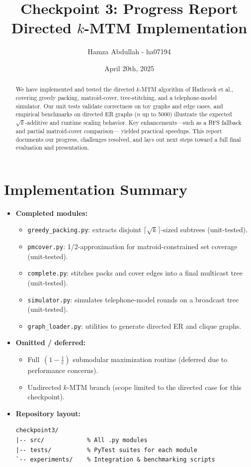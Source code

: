 \documentclass[11pt]{article}
\title{Checkpoint 3: Progress Report\\
\large Directed \(k\)-MTM Implementation}
\author{Hamza Abdullah - ha07194}
\date{April 20th, 2025}
\begin{document}
\maketitle

\begin{abstract}
We have implemented and tested the directed \(k\)-MTM algorithm of Hathcock et al., covering
greedy packing, matroid‐cover, tree‐stitching, and a telephone‐model simulator.  Our unit tests
validate correctness on toy graphs and edge cases, and empirical benchmarks on directed ER
graphs (\(n\) up to 5000) illustrate the expected \(\sqrt{k}\)-additive and runtime scaling
behavior.  Key enhancements—such as a BFS fallback and partial matroid‐cover comparison—
yielded practical speedups.  This report documents our progress, challenges resolved, and
lays out next steps toward a full final evaluation and presentation.
\end{abstract}

\section{Implementation Summary}

\begin{itemize}
  \item \textbf{Completed modules:}
    \begin{itemize}
      \item \texttt{greedy\_packing.py}: extracts disjoint $\lceil\sqrt{k}\rceil$-sized subtrees (unit-tested).
      \item \texttt{pmcover.py}: 1/2-approximation for matroid-constrained set coverage (unit-tested).
      \item \texttt{complete.py}: stitches packs and cover edges into a final multicast tree (unit-tested).
      \item \texttt{simulator.py}: simulates telephone-model rounds on a broadcast tree (unit-tested).
      \item \texttt{graph\_loader.py}: utilities to generate directed ER and clique graphs.
    \end{itemize}
  \item \textbf{Omitted / deferred:}
    \begin{itemize}
      \item Full \(\,(1-\tfrac{1}{e})\) submodular maximization routine (deferred due to performance concerns).
      \item Undirected \(k\)-MTM branch (scope limited to the directed case for this checkpoint).
    \end{itemize}
  \item \textbf{Repository layout:}
    \begin{lstlisting}[basicstyle=\ttfamily,columns=fullflexible]
checkpoint3/
|-- src/            % All .py modules
|-- tests/          % PyTest suites for each module
`-- experiments/    % Integration & benchmarking scripts
    \end{lstlisting}
\end{itemize}
\end{document}
